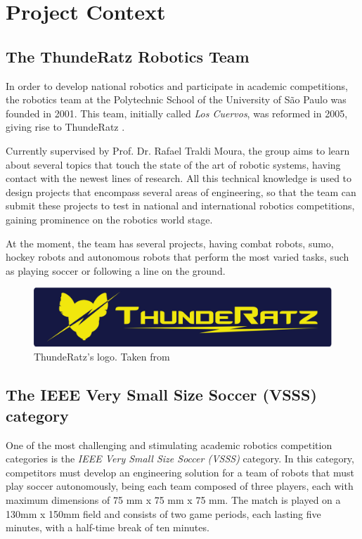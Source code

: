 \section{Project Context}

\subsection{The ThundeRatz Robotics Team}

In order to develop national robotics and participate in academic competitions, the robotics team at the Polytechnic School of the University of São Paulo was founded in 2001. This team, initially called \textit{Los Cuervos}, was reformed in 2005, giving rise to ThundeRatz \cite{ThundeRatz}.

Currently supervised by Prof. Dr. Rafael Traldi Moura, the group aims to learn about several topics that touch the state of the art of robotic systems, having contact with the newest lines of research. All this technical knowledge is used to design projects that encompass several areas of engineering, so that the team can submit these projects to test in national and international robotics competitions, gaining prominence on the robotics world stage.

At the moment, the team has several projects, having combat robots, sumo, hockey robots and autonomous robots that perform the most varied tasks, such as playing soccer or following a line on the ground.

\begin{figure}[!h]
    \centering
    \includegraphics[width=.6\linewidth]{images/ThundeRatz Logo.png}
    \caption{ThundeRatz's logo. Taken from \cite{ThundeRatz}}
\end{figure}

\subsection{The IEEE Very Small Size Soccer (VSSS) category}

One of the most challenging and stimulating academic robotics competition categories is the \textit{IEEE Very Small Size Soccer (VSSS)} category. In this category, competitors must develop an engineering solution for a team of robots that must play soccer autonomously, being each team composed of three players, each with maximum dimensions of 75 mm x 75 mm x 75 mm. The match is played on a 130mm x 150mm field and consists of two game periods, each lasting five minutes, with a half-time break of ten minutes.

